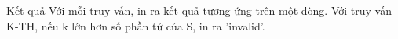Kết quả
Với mỗi truy vấn, in ra kết quả tương ứng trên một dòng. Với truy vấn K-TH, nếu k lớn hơn số phần tử của S, in ra 'invalid'.